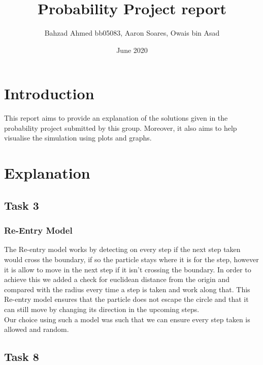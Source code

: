 \documentclass{article}
\title{Probability Project report}
\author{ Bahzad Ahmed bb05083, Aaron Soares, Owais bin Asad }
\date{June 2020}
\begin{document}
\maketitle

\section{Introduction}
This report aims to provide an explanation of the solutions given in the probability project submitted by this group. Moreover, it also aims to help visualise the simulation using plots and graphs.

\section{Explanation}
\subsection{Task 3}
\subsubsection{Re-Entry Model}
The Re-entry model works by detecting on every step if the next step taken would cross the boundary, if so the particle stays where it is for the step, however it is allow to move in the next step if it isn't crossing the boundary. In order to achieve this we added a check for euclidean distance from the origin and compared with the radius every time a step is taken and work along that. This Re-entry model ensures that the particle does not escape the circle and that it can still move by changing its direction in the upcoming steps.\\
Our choice using such a model was such that we can ensure every step taken is allowed and random.

\subsection{Task 8}
\end{document}
